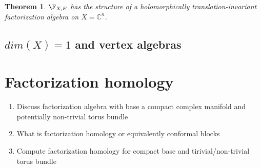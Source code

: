 \documentclass[12pt]{amsart}
\newtheorem{theorem}{Theorem}[section]
\theoremstyle{definition}
\theoremstyle{remark}
\def\brian{\textcolor{blue}{BW: }\textcolor{blue}}
\begin{document}
\begin{theorem}
$\F_{X,E}$ has the structure of a holomorphically translation-invariant factorization algebra on $X=\mathbb{C}^n$. 
\end{theorem}

\subsection{$dim(X)=1$ and vertex algebras}

\section{Factorization homology}

{\color{red}
\begin{enumerate}
\item Discuss factorization algebra with base a compact complex manifold and potentially non-trivial torus bundle
\item What is factorization homology or equivalently conformal blocks
\item Compute factorization homology for compact base and tirivial/non-trivial torus bundle
\end{enumerate}
}

\newpage


%  




\address{\tiny DEPARTMENT OF MATHEMATICS AND STATISTICS, BOSTON UNIVERSITY, 111 CUMMINGTON MALL, BOSTON} \\
\indent \footnotesize{}

\address{\tiny DEPARTMENT OF MATHEMATICS, NORTH\brian{WESTERN/EASTERN},...}
\indent \footnotesize{}
\end{document}
